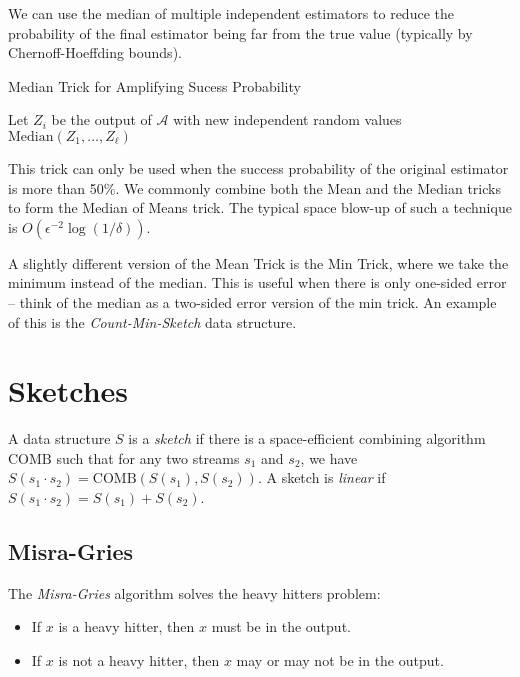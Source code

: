 \documentclass{article}
\begin{document}
We can use the median of multiple independent estimators to reduce the probability of the final estimator being far from the true value (typically by Chernoff-Hoeffding bounds).

\begin{algorithm}
  \caption{Median Trick for Amplifying Sucess Probability}
  \begin{algorithmic}[1]
    \State Let $Z_i$ be the output of $\mathcal{A}$ with new independent random values
    \EndFor
    \State \Return $\text{Median}(Z_1, \ldots, Z_\ell)$
    \EndProcedure
  \end{algorithmic}
\end{algorithm}

This trick can only be used when the success probability of the original estimator is more than 50\%.
We commonly combine both the Mean and the Median tricks to form the Median of Means trick.
The typical space blow-up of such a technique is $O(\epsilon^{-2} \log (1 / \delta))$.

A slightly different version of the Mean Trick is the Min Trick, where we take the minimum instead of the median.
This is useful when there is only one-sided error -- think of the median as a two-sided error version of the min trick.
An example of this is the \emph{Count-Min-Sketch} data structure.

\pagebreak

\section{Sketches}

\begin{definition}
  A data structure $S$ is a \emph{sketch} if there is a space-efficient combining algorithm $\text{COMB}$ such that for any two streams $s_1$ and $s_2$, we have $S(s_1 \cdot s_2) = \text{COMB}(S(s_1), S(s_2))$.
  A sketch is \emph{linear} if $S(s_1 \cdot s_2) = S(s_1) + S(s_2)$.
\end{definition}

\subsection{Misra-Gries}

The \emph{Misra-Gries} algorithm solves the heavy hitters problem:
\begin{itemize}
  \item If $x$ is a heavy hitter, then $x$ must be in the output.
  \item If $x$ is not a heavy hitter, then $x$ may or may not be in the output.
\end{itemize}
\end{document}
